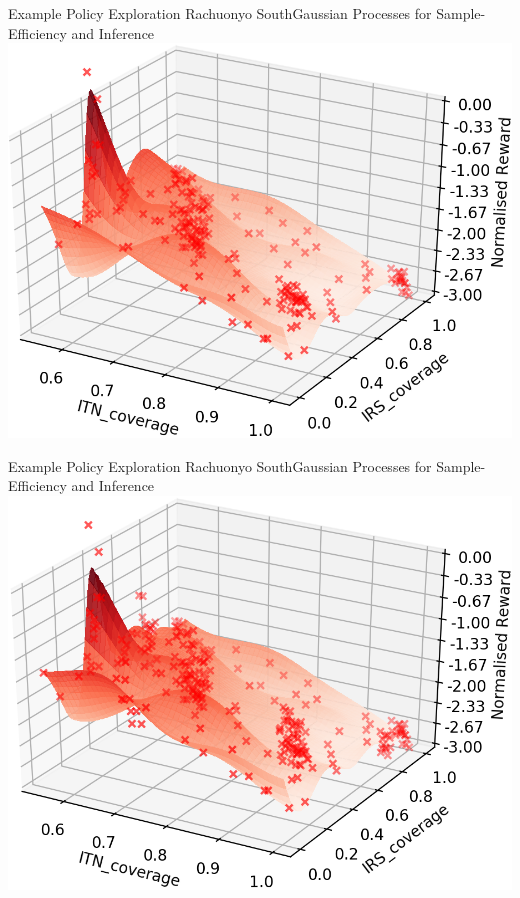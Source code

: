 \documentclass[10pt,usenames,dvipsnames]{beamer}
\begin{document}
\begin{frame}{Example Policy Exploration Rachuonyo South}{Gaussian Processes for Sample-Efficiency and Inference}
\centering
\includegraphics[width=1\textheight]{images/Batch_3.png}
\end{frame}
\begin{frame}{Example Policy Exploration Rachuonyo South}{Gaussian Processes for Sample-Efficiency and Inference}
\centering
\includegraphics[width=1\textheight]{images/Batch_4.png}
\end{frame}
\end{document}
